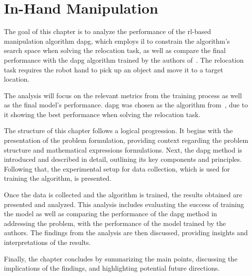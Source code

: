 \chapter{In-Hand Manipulation}\label{ch:3-in-hand-manipulation}

The goal of this chapter is to analyze the performance of the \gls{rl}-based manipulation algorithm \gls{dapg}, which employs \gls{il} to constrain the algorithm's search space when solving the relocation task, as well as compare the final performance with the \gls{dapg} algorithm trained by the authors of~\cite{dexmv:-imitation-learning-for-dexterous-manipulation-from-human-videos}. The relocation task requires the robot hand to pick up an object and move it to a target location.\medskip 

The analysis will focus on the relevant metrics from the training process as well as the final model's performance. \gls{dapg} was chosen as the algorithm from~\cite{dexmv:-imitation-learning-for-dexterous-manipulation-from-human-videos}, due to it showing the best performance when solving the relocation task. \medskip

The structure of this chapter follows a logical progression. It begins with the presentation of the problem formulation, providing context regarding the problem structure and mathematical expressions formulations. Next, the \gls{dapg} method is introduced and described in detail, outlining its key components and principles. Following that, the experimental setup for data collection, which is used for training the algorithm, is presented.\medskip

Once the data is collected and the algorithm is trained, the results obtained are presented and analyzed. This analysis includes evaluating the success of training the model as well as comparing the performance of the \gls{dapg} method in addressing the problem, with the performance of the model trained by the authors. The findings from the analysis are then discussed, providing insights and interpretations of the results. \medskip

Finally, the chapter concludes by summarizing the main points, discussing the implications of the findings, and highlighting potential future directions.\medskip


